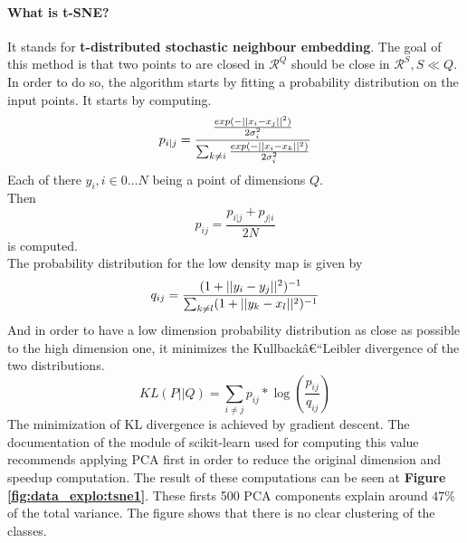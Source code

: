 \paragraph{What is t-SNE?} It stands for \textbf{t-distributed stochastic neighbour embedding}. The goal of this method is that two points to are closed in $\mathcal{R}^{Q}$ should be close in $\mathcal{R}^{S}, S \ll Q$. In order to do so, the algorithm starts by fitting a probability distribution on the input points. It starts by computing.
\begin{equation*}
 p_{i|j} = \frac{\frac{exp(-||x_i - x_j||^2)}{2 \sigma_i^2}}{\sum_{k \neq i} \frac{exp(-||x_i - x_k||^2)}{2 \sigma_i^2}}\\
\end{equation*}
Each of there $y_i, i \in 0 \dots N$ being a point of dimensions $Q$.\\
Then 
\begin{equation*}
 p_{ij} = \frac{p_{i|j} + p_{j|i} }{2N}
\end{equation*}
is computed. \\
The probability distribution for the low density map is given by 
\begin{equation*}
 q_{ij} = \frac{(1 + ||y_i - y_j||^2)^{-1}}{\sum_{k \neq l} (1 +||y_k - x_l||^2)^{-1}}\\
\end{equation*}
And in order to have a low dimension probability distribution as close as possible to the high dimension one, it minimizes the Kullbackâ€“Leibler divergence of the two distributions. 
\begin{equation*}
 KL(P||Q) = \sum_{i \neq j} p_{ij} * \log(\frac{p_{ij}}{q_{ij}})
\end{equation*}
The minimization of KL divergence is achieved by gradient descent. 
The documentation of the module of scikit-learn\cite{scikit-learn} used for computing this value recommends applying PCA first in order to reduce the original dimension and speedup computation. The result of these computations can be seen at \textbf{Figure \ref{fig:data_explo:tsne1}}. These firsts 500 PCA components explain around $47\%$ of the total variance. The figure shows that there is no clear clustering of the classes. \\

